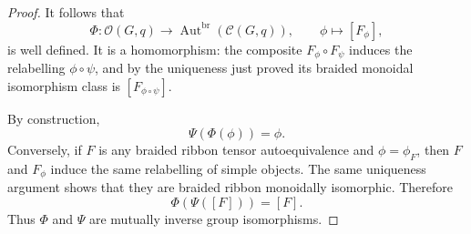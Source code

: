 \documentclass[10pt,a4paper]{amsart}
\begin{document}
\begin{proof}
It follows that
$$
\Phi:
\mathcal O(G,q)
\longrightarrow
\operatorname{Aut}^{\mathrm{br}}(\mathcal C(G,q)),
\qquad
\phi\longmapsto[F_\phi],
$$
is well defined. It is a homomorphism: the composite $F_\phi\circ F_\psi$ induces the relabelling $\phi\circ\psi$, and by the uniqueness just proved its braided monoidal isomorphism class is $[F_{\phi\circ\psi}]$.

By construction,
$$
\Psi(\Phi(\phi))=\phi.
$$
Conversely, if $F$ is any braided ribbon tensor autoequivalence and $\phi=\phi_F$, then $F$ and $F_\phi$ induce the same relabelling of simple objects. The same uniqueness argument shows that they are braided ribbon monoidally isomorphic. Therefore
$$
\Phi(\Psi([F]))=[F].
$$
Thus $\Phi$ and $\Psi$ are mutually inverse group isomorphisms.
\end{proof}
\end{document}
